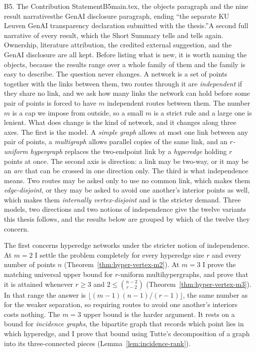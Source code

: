 \begin{offcutrewrite}{B5. The Contribution Statement}{B5}{main.tex, the objects paragraph and the nine result narratives}{the GenAI disclosure paragraph, ending ``the separate KU Leuven GenAI transparency declaration submitted with the thesis.''}{A second full narrative of every result, which the Short Summary tells and  tells again. Ownership, literature attribution, the credited external suggestion, and the GenAI disclosure are all kept.}
Before listing what is new, it is worth naming the objects, because the results range over a whole family of them and the family is easy to describe. The question never changes. A network is a set of points together with the links between them, two routes through it are \emph{independent} if they share no link, and we ask how many links the network can hold before some pair of points is forced to have $m$ independent routes between them. The number $m$ is a cap we impose from outside, so a small $m$ is a strict rule and a large one is lenient. What does change is the kind of network, and it changes along three axes. The first is the model. A \emph{simple graph} allows at most one link between any pair of points, a \emph{multigraph} allows parallel copies of the same link, and an \emph{$r$-uniform hypergraph} replaces the two-endpoint link by a \emph{hyperedge} holding $r$ points at once. The second axis is direction: a link may be two-way, or it may be an \emph{arc} that can be crossed in one direction only. The third is what independence means. Two routes may be asked only to use no common link, which makes them \emph{edge-disjoint}, or they may be asked to avoid one another's interior points as well, which makes them \emph{internally vertex-disjoint} and is the stricter demand. Three models, two directions and two notions of independence give the twelve variants this thesis follows, and the results below are grouped by which of the twelve they concern.

The first concerns hyperedge networks under the stricter notion of independence. At $m=2$ I settle the problem completely for every hyperedge size $r$ and every number of points $n$ (Theorem~\ref{thm:hyper-vertex-m2}). At $m=3$ I prove the matching universal upper bound for $r$-uniform multihypergraphs, and prove that it is attained whenever $r\ge3$ and $2\le\binom{n-2}{r-2}$ (Theorem~\ref{thm:hyper-vertex-m3}). In that range the answer is $\lfloor(m-1)(n-1)/(r-1)\rfloor$, the same number as for the weaker separation, so requiring routes to avoid one another's interiors costs nothing. The $m=3$ upper bound is the harder argument. It rests on a bound for \emph{incidence graphs}, the bipartite graph that records which point lies in which hyperedge, and I prove that bound using Tutte's decomposition of a graph into its three-connected pieces (Lemma~\ref{lem:incidence-rank}).


\end{offcutrewrite}
